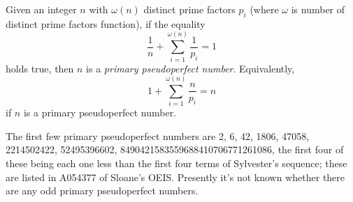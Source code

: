 \documentclass[12pt]{article}
\begin{document}
Given an integer $n$ with $\omega(n)$ distinct prime factors $p_i$ (where $\omega$ is number of distinct prime factors function), if the equality $$\frac1n + \sum_{i = 1}^{\omega(n)} \frac1{p_i} = 1$$ holds true, then $n$ is a \emph{primary pseudoperfect number}. Equivalently, $$1 + \sum_{i = 1}^{\omega(n)} \frac{n}{p_i} = n$$ if $n$ is a primary pseudoperfect number.

The first few primary pseudoperfect numbers are 2, 6, 42, 1806, 47058, 2214502422, 52495396602, 8490421583559688410706771261086, the first four of these being each one less than the first four terms of Sylvester's sequence; these are listed in A054377 of Sloane's OEIS. Presently it's not known whether there are any odd primary pseudoperfect numbers.

\end{document}
